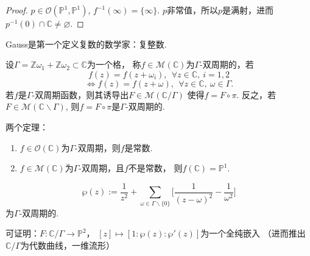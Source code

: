 \begin{proof}
	$p\in \mathcal{O}(\mathbb{P}^1,\mathbb{P}^1)$, $f^{-1}(\infty)=\{\infty\}$. 
    $p$非常值，所以$p$是满射，进而$p^{-1}(0)\cap \mathbb{C}\neq \varnothing$.
\end{proof}
	
\begin{remark}
	Gauss是第一个定义复数的数学家：复整数.
\end{remark}
	
\begin{definition}[双周期函数]
	设$\Gamma=\mathbb{Z}\omega_1+\mathbb{Z}\omega_2\subset \mathbb{C}$为一个格，
    称$f\in \mathscr{M}(\mathbb{C})$为$\Gamma$-双周期的，若
	$$f(z)=f(z+\omega_i), \ \ \forall z\in \mathbb{C},\ i=1,2$$
	$$\iff f(z)=f(z+\omega),\ \ \forall z\in \mathbb{C},\ \omega\in \Gamma.$$
	若$f$是$\Gamma$-双周期函数，则其诱导出$F\in \mathscr{M}(\mathbb{C}/ \Gamma)$
    使得$f=F\circ \pi$. 反之，若$F\in \mathscr{M}(\mathbb{C}\backslash \Gamma)$, 
    则$f=F\circ \pi$是$\Gamma$-双周期的.
		
\end{definition}
		
\begin{theorem} 两个定理：
	\begin{enumerate}
		\item[1.] $f\in \mathcal{O}(\mathbb{C})$为$\Gamma$-双周期，则$f$是常数.
		\item[2.] $f\in \mathscr{M}(\mathbb{C})$为$\Gamma$-双周期，且$f$不是常数，
        则$f(\mathbb{C})=\mathbb{P}^1$.
	\end{enumerate}
\end{theorem}	
	
\begin{example}[Weierstrass $\wp$-函数]
	$$\wp(z):=\frac{1}{z^2}
    +\sum_{\omega\in \Gamma\backslash \{0\}} 
    \bigg[\frac{1}{(z-\omega)^2}-\frac{1}{\omega^2}\bigg]$$
	为$\Gamma$-双周期的.
\end{example}	

\begin{remark}
	可证明：$F\colon \mathbb{C}/\Gamma\rightarrow \mathbb{P}^2$，
    $[z]\mapsto [1:\wp(z):\wp'(z)]$为一个全纯嵌入
    （进而推出$\mathbb{C}/\Gamma$为代数曲线，一维流形）
\end{remark}


